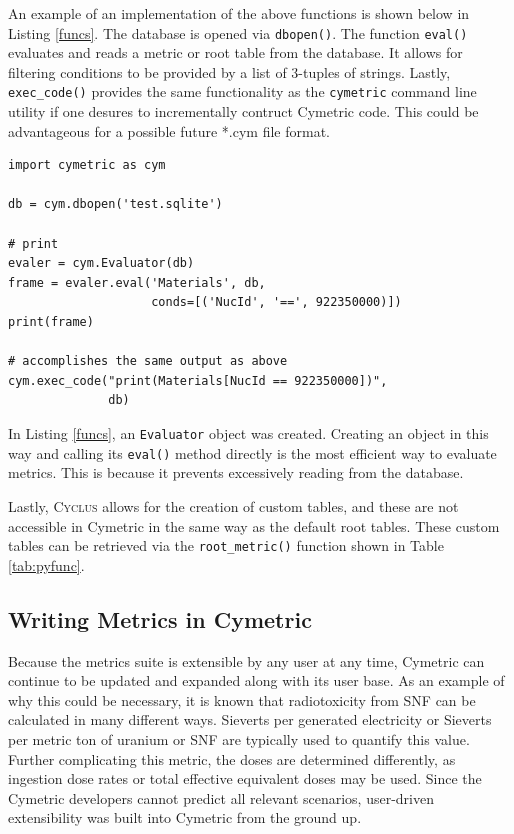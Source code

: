 \documentclass{anstrans}
\newcommand{\cyclus}{\textsc{Cyclus}\xspace}
\newcommand{\code}[1]{{\color{code}\texttt{#1}}}
\begin{document}
An example of an implementation of the above functions is shown below in 
Listing \ref{funcs}. The database is opened via \code{dbopen()}. The 
function \code{eval()} evaluates and reads a metric or root table from the 
database. It allows for filtering conditions to be provided by a list of 
3-tuples of strings. 
Lastly, \code{exec\_code()} provides the same functionality as the
\code{cymetric} command line utility if one desures to incrementally contruct Cymetric code. 
This could be advantageous for a possible future *.cym file format.

\begin{lstlisting}[caption ={Example Python Script Using Cymetric}, label=funcs]
import cymetric as cym

db = cym.dbopen('test.sqlite')

# print 
evaler = cym.Evaluator(db)
frame = evaler.eval('Materials', db, 
                    conds=[('NucId', '==', 922350000)])
print(frame)

# accomplishes the same output as above
cym.exec_code("print(Materials[NucId == 922350000])", 
              db)
\end{lstlisting}

In Listing \ref{funcs}, an \code{Evaluator} object was created. 
Creating an object in this way and calling its \code{eval()} method directly 
is the most efficient way to evaluate metrics. This is because
it prevents excessively reading from the database.

Lastly, \cyclus allows for the creation of custom tables, and these are not accessible in 
Cymetric in the same way as the default root tables. 
These custom tables can be retrieved via the \code{root\_metric()} function shown in Table \ref{tab:pyfunc}.

\subsection{Writing Metrics in Cymetric}
Because the metrics suite is extensible by any user at any time, Cymetric
can continue to be updated and expanded along with its user base. 
As an example of why this could be necessary, it is known that radiotoxicity from \gls{SNF} can 
be calculated in many different ways. Sieverts per generated electricity 
or Sieverts per metric ton of uranium or \gls{SNF} are typically used to 
quantify this value. Further complicating this metric, the doses are determined differently, as 
ingestion dose rates or total effective equivalent doses may be used. 
Since the Cymetric developers cannot predict all relevant scenarios, 
user-driven extensibility was built into Cymetric from the ground up. 
\end{document}
